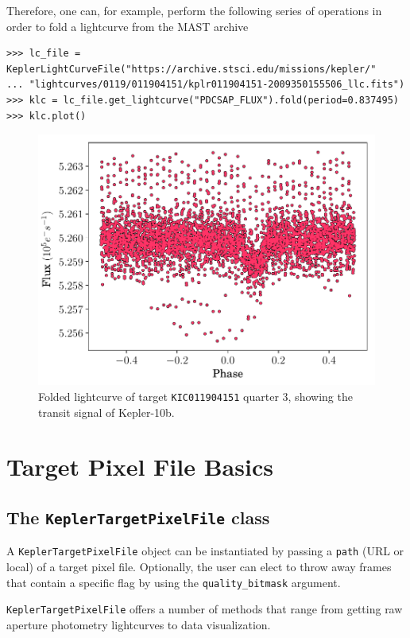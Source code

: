 \documentclass{article}
\begin{document}
        Therefore, one can, for example, perform the following series of operations
        in order to fold a lightcurve from the MAST archive
\begin{verbatim}
>>> lc_file = KeplerLightCurveFile("https://archive.stsci.edu/missions/kepler/"
... "lightcurves/0119/011904151/kplr011904151-2009350155506_llc.fits")
>>> klc = lc_file.get_lightcurve("PDCSAP_FLUX").fold(period=0.837495)
>>> klc.plot()
\end{verbatim}
        \begin{figure}[!htb]
            \centering
            \includegraphics[scale=.5]{figs/fold-lc.pdf}
            \caption{Folded lightcurve of target \texttt{KIC011904151} quarter 3, showing the
            transit signal of Kepler-10b.}
            \label{fig:fold-method}
        \end{figure}

\section{Target Pixel File Basics}
    \subsection{The \texttt{KeplerTargetPixelFile} class}
        A \texttt{KeplerTargetPixelFile} object can be instantiated
        by passing a \texttt{path} (URL or local) of a target pixel file.
        Optionally, the user can elect to throw away frames that contain
        a specific flag by using the \texttt{quality\_bitmask} argument.

        \texttt{KeplerTargetPixelFile} offers a number of methods
        that range from getting raw aperture photometry lightcurves to
        data visualization.
\end{document}
